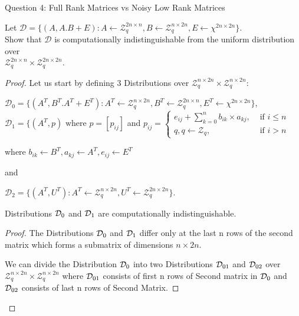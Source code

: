 \begin{solution}{Question 4: Full Rank Matrices vs Noisy Low Rank Matrices}\label{ques:4}
    \begin{question}
    Let $\mathcal{D} = \{ (A,A.B +E) : A \leftarrow \mathcal{Z}_q^{2n\times n}, B \leftarrow \mathcal{Z}_q^{n\times 2n}, E \leftarrow \chi^{2n\times 2n} \}$.\\
    Show that $\mathcal{D}$ is computationally indistinguishable from the uniform distribution over \\ $\mathcal{Z}_q^{2n\times n} \times \mathcal{Z}_q^{2n\times2n}$.
    \end{question}
    \tcblower{}
    
    \begin{proof}
    Let us start by defining 3 Distributions over $\mathcal{Z}_q^{n\times 2n} \times \mathcal{Z}_q^{n\times 2n}$:
     
     $\mathcal{D}_0 = \{ (A^T,B^T . A^T +E^T) : A^T \leftarrow \mathcal{Z}_q^{n\times 2n}, B^T \leftarrow \mathcal{Z}_q^{2n\times n}, E^T \leftarrow \chi^{2n\times 2n} \}$,\\

     $\mathcal{D}_1 = \{ (A^T,p) \text{ where } p = [p_{ij}]$ and  $p_{ij} = 
     \begin{cases}
      e_{ij} + \sum_{k=0}^{n} b_{ik}\times a_{kj} , &\text{ if } i \leq n \\
      q, q\leftarrow \mathcal{Z}_q, &\text{ if } i>n
     \end{cases} $
     
     where $ b_{ik}\leftarrow B^T, a_{kj}\leftarrow A^T, e_{ij}\leftarrow E^T $

     and 

     $\mathcal{D}_2 = \{ (A^T,U^T) : A^T \leftarrow \mathcal{Z}_q^{n\times 2n}, U^T \leftarrow \mathcal{Z}_q^{2n\times 2n} \}$.

     \begin{claim}
     Distributions $\mathcal{D}_0$ and $\mathcal{D}_1$ are computationally indistinguishable.
     \end{claim}

     \begin{proof}
         The Distributions $\mathcal{D}_0$ and $\mathcal{D}_1$ differ only at the last n rows of the second matrix which forms a submatrix of dimensions $n \times 2n$.

         We can divide the Distribution $\mathcal{D}_0$ into two Distributions $\mathcal{D}_{01}$ and $\mathcal{D}_{02}$ over $\mathcal{Z}_q^{n\times 2n} \times \mathcal{Z}_q^{n\times 2n}$ where $\mathcal{D}_{01}$ consists of first n rows of Second matrix in $\mathcal{D}_0$ and $\mathcal{D}_{02}$ consists of last n rows of Second Matrix.


\end{proof}
\end{proof}
\end{solution}
